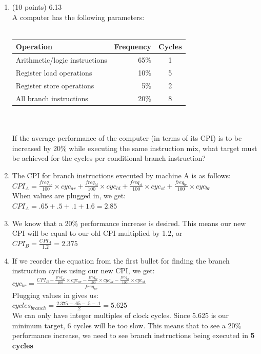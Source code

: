 \documentclass[letterpaper,10pt,onecolumn,titlepage]{article}
\begin{document}
\begin{enumerate}
\item (10 points) 6.13 \\
	A computer has the following parameters:\\
	\\
	\begin{tabular}{ l r c }
		Operation & Frequency & Cycles \\
		\hline
		Arithmetic/logic instructions & 65\% & 1 \\
		     Register load operations & 10\% & 5 \\
		    Register store operations &  5\% & 2 \\
		      All branch instructions & 20\% & 8 \\
	\end{tabular} \\ \\
	If the average performance of the computer (in terms of its CPI) is to be
	increased by 20\% while executing the same instruction mix, what target
	must be achieved for the cycles per conditional branch instruction?
	\item[\textbullet] The CPI for branch instructions executed by machine A is as 
		follows: \\
		$CPI_{A} = \frac{freq_{ar}}{100} \times cyc_{ar} + 
			   \frac{freq_{ld}}{100} \times cyc_{ld} + 
			   \frac{freq_{st}}{100} \times cyc_{st} + 
			   \frac{freq_{br}}{100} \times cyc_{br}$ \\
		When values are plugged in, we get: \\
		$CPI_{A} = .65 + .5 + .1 + 1.6 = 2.85$ 
	\item[\textbullet] We know that a 20\% performance increase is desired. This means
		our new CPI will be equal to our old CPI multiplied by 1.2, or\\
		$CPI_{B} = \frac{CPI_{A}}{1.2} = 2.375$
	\item[\textbullet] If we reorder the equation from the first bullet for finding
		the branch instruction cycles using our new CPI, we get:\\
		$cyc_{br} = \frac{CPI_{B} - 
				  \frac{freq_{ar}}{100} \times cyc_{ar} - 
				  \frac{freq_{ld}}{100} \times cyc_{ld} - 
			  	  \frac{freq_{st}}{100} \times cyc_{st}}
				  {freq_{br}}$ \\
		Plugging values in gives us: \\
		$cycles_{branch} = \frac{2.375-.65-.5-.1}{.2} = 5.625$ \\
		We can only have integer multiples of clock cycles. Since 5.625 is our
		minimum target, 6 cycles will be too slow. This means that to see a 20\%
		performance increase, we need to see branch instructions being executed in 
		\textbf{5 cycles}


\end{enumerate}
\end{document}
